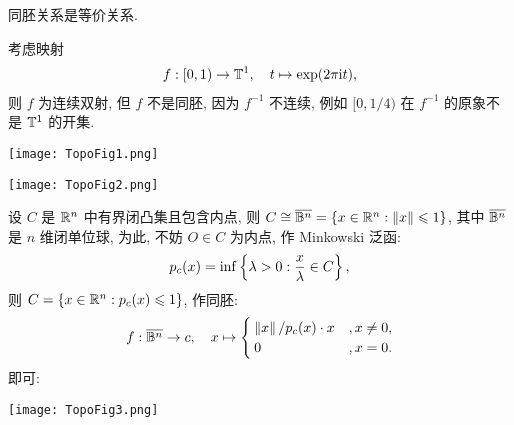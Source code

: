     \begin{Proposition}
        同胚关系是等价关系.
    \end{Proposition}

    \begin{Example}\label{ex:局部同胚不同胚}
        考虑映射
        \begin{align*}
            f: [0, 1)\to \mathbb{T}^{1},\quad t\mapsto \exp(2\pi \mathrm{i} t),
        \end{align*}
        则 $ f $ 为连续双射, 但 $ f $ 不是同胚, 因为 $ f^{-1} $ 不连续, 例如 $ [0, 1/4) $ 在 $ f^{-1} $ 的原象不是 $ \mathbb{T}^{1} $ 的开集.

        \begin{minipage}[c]{.4\textwidth}
            \centering
            \vspace{1em}
            \texttt{[image: TopoFig1.png]}
        \end{minipage}\quad
        \begin{minipage}[c]{.4\textwidth}
            \centering
            \vspace{.3em}
            \texttt{[image: TopoFig2.png]}
        \end{minipage}
    \end{Example}

    \begin{Example}
        设 $ C $ 是 $ \mathbb{R}^{n} $ 中有界闭凸集且包含内点, 则 $ C\cong \overline{\mathbb{B}^{n}}=\left\{ x\in\mathbb{R}^{n}:\left\| x \right\|\leqslant 1 \right\} $, 其中 $ \overline{\mathbb{B}^{n}} $ 是 $ n $ 维闭单位球, 为此, 不妨 $ O\in C $ 为内点, 作 Minkowski 泛函:
        \begin{align*}
            p_{c}(x)=\inf\left\{ \lambda>0: \frac{x}{\lambda}\in C \right\},
        \end{align*}
        则 $ C=\left\{ x\in\mathbb{R}^{n}:p_{c}(x)\leqslant1 \right\} $, 作同胚:
        \begin{align*}
            f:\overline{\mathbb{B}^{n}}\to c,\quad x\mapsto\begin{cases}
                \left\| x \right\|/p_{c}(x)\cdot x & , x\neq 0,\\
                0 & , x=0.
            \end{cases}
        \end{align*}
        即可:
        \begin{center}
            \texttt{[image: TopoFig3.png]}
        \end{center}
    \end{Example}

